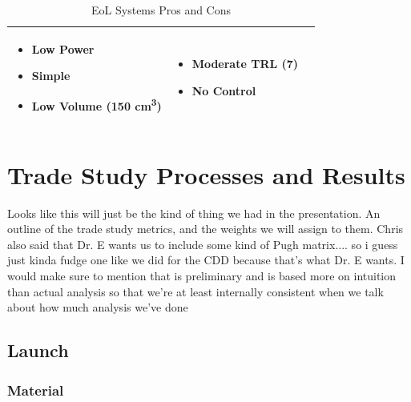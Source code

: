 \documentclass{ece}
\begin{document}
\begin{table}[H]
\begin{tabular}{|p{}|p{}|p{}|}
    \begin{itemize}
        \item Low Power
        \item Simple
        \item Low Volume (150 cm\textsuperscript{3})\cite{RODEO_Presentation}
    \end{itemize}
    &
    \begin{itemize}
        \item Moderate TRL (7)
        \item No Control
    \end{itemize}
    \\
\hline
\end{tabular}
\caption{EoL Systems Pros and Cons}
\label{tbl:Eol_ProCon}
\end{table}

\section{Trade Study Processes and Results}
Looks like this will just be the kind of thing we had in the presentation. An outline of the trade study metrics, and the weights we will assign to them. Chris also said that Dr. E wants us to include some kind of Pugh matrix.... so i guess just kinda fudge one like we did for the CDD because that's what Dr. E wants. I would make sure to mention that is preliminary and is based more on intuition than actual analysis so that we're at least internally consistent when we talk about how much analysis we've done

\subsection{Launch}

\subsubsection{Material}
\end{document}
